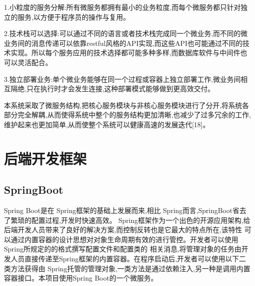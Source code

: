 
1.小粒度的服务分解:所有微服务都拥有最小的业务粒度,而每个微服务都只针对独立的服务,以方便于程序员的操作与复用。

2.技术栈可以选择:可以通过不同的语言或者技术栈完成同一个微业务,而不同的微业务间的消息传递可以依靠restful风格的API实现,而这些API也可能通过不同的技术实现。所以每个服务应用的技术选择都可能多种多样,而数据库软件与中间件也可以灵活配合。

3.独立部署业务:单个微业务能够在同一个过程或容器上独立部署工作,微业务间相互隔绝,只在执行时才会发生连接,这种部署模式能够做到更高效交付。

本系统采取了微服务结构,把核心服务模块与非核心服务模块进行了分开,将系统各部分完全解耦,从而使得系统中整个的服务结构更加清晰,也减少了过多冗余的工作,维护起来也更加简单,从而使整个系统可以健康高速的发展迭代[18]。

\section{后端开发框架}

\subsection{SpringBoot}


Spring Boot是在 Spring框架的基础上发展而来,相比 Spring而言,SpringBoot省去了繁琐的配置过程,开发时快速高效。
Spring框架作为一个出色的开源应用架构,给后端开发人员带来了良好的解决方案,而控制反转也是它最大的特点所在,该特性
可以通过内置容器的设计思想对对象生命周期有效的进行管控。开发者可以使用Spring所规定的的格式撰写配置文件和配置类的
相关消息,将管理对象的任务由开发人员直接传递至Spring框架的内置容器。在程序启动后,开发者可以使用以下二类方法获得由
Spring托管的管理对象,一类方法是通过依赖注入,另一种是调用内置容器接口。本项目使用Spring Boot的一个微服务。


